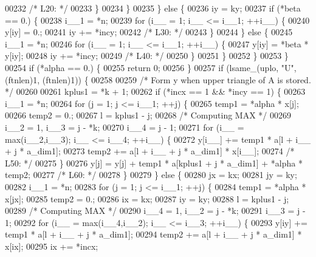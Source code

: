 \begin{DoxyCode}
00232 \textcolor{comment}{/* L20: */}
00233         \}
00234         \}
00235     \} \textcolor{keywordflow}{else} \{
00236         iy = ky;
00237         \textcolor{keywordflow}{if} (*beta == 0.) \{
00238         i\_\_1 = *n;
00239         \textcolor{keywordflow}{for} (i\_\_ = 1; i\_\_ <= i\_\_1; ++i\_\_) \{
00240             y[iy] = 0.;
00241             iy += *incy;
00242 \textcolor{comment}{/* L30: */}
00243         \}
00244         \} \textcolor{keywordflow}{else} \{
00245         i\_\_1 = *n;
00246         \textcolor{keywordflow}{for} (i\_\_ = 1; i\_\_ <= i\_\_1; ++i\_\_) \{
00247             y[iy] = *beta * y[iy];
00248             iy += *incy;
00249 \textcolor{comment}{/* L40: */}
00250         \}
00251         \}
00252     \}
00253     \}
00254     \textcolor{keywordflow}{if} (*alpha == 0.) \{
00255     \textcolor{keywordflow}{return} 0;
00256     \}
00257     \textcolor{keywordflow}{if} (lsame\_(uplo, \textcolor{stringliteral}{"U"}, (ftnlen)1, (ftnlen)1)) \{
00258 
00259 \textcolor{comment}{/*        Form  y  when upper triangle of A is stored. */}
00260 
00261     kplus1 = *k + 1;
00262     \textcolor{keywordflow}{if} (*incx == 1 && *incy == 1) \{
00263         i\_\_1 = *n;
00264         \textcolor{keywordflow}{for} (j = 1; j <= i\_\_1; ++j) \{
00265         temp1 = *alpha * x[j];
00266         temp2 = 0.;
00267         l = kplus1 - j;
00268 \textcolor{comment}{/* Computing MAX */}
00269         i\_\_2 = 1, i\_\_3 = j - *k;
00270         i\_\_4 = j - 1;
00271         \textcolor{keywordflow}{for} (i\_\_ = max(i\_\_2,i\_\_3); i\_\_ <= i\_\_4; ++i\_\_) \{
00272             y[i\_\_] += temp1 * a[l + i\_\_ + j * a\_dim1];
00273             temp2 += a[l + i\_\_ + j * a\_dim1] * x[i\_\_];
00274 \textcolor{comment}{/* L50: */}
00275         \}
00276         y[j] = y[j] + temp1 * a[kplus1 + j * a\_dim1] + *alpha * temp2;
00277 \textcolor{comment}{/* L60: */}
00278         \}
00279     \} \textcolor{keywordflow}{else} \{
00280         jx = kx;
00281         jy = ky;
00282         i\_\_1 = *n;
00283         \textcolor{keywordflow}{for} (j = 1; j <= i\_\_1; ++j) \{
00284         temp1 = *alpha * x[jx];
00285         temp2 = 0.;
00286         ix = kx;
00287         iy = ky;
00288         l = kplus1 - j;
00289 \textcolor{comment}{/* Computing MAX */}
00290         i\_\_4 = 1, i\_\_2 = j - *k;
00291         i\_\_3 = j - 1;
00292         \textcolor{keywordflow}{for} (i\_\_ = max(i\_\_4,i\_\_2); i\_\_ <= i\_\_3; ++i\_\_) \{
00293             y[iy] += temp1 * a[l + i\_\_ + j * a\_dim1];
00294             temp2 += a[l + i\_\_ + j * a\_dim1] * x[ix];
00295             ix += *incx;

\end{DoxyCode}
